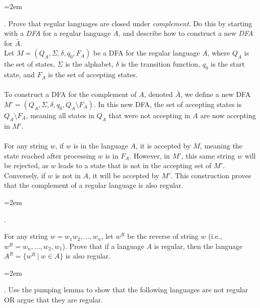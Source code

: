 \documentclass[12pt]{article}
\newcounter{quesnum}
\newcommand{\question}[2][??]{
\begin{list}{\labelitemi}{\leftmargin=2em}
\item [\arabic{quesnum}.] {} {#2}
\end{list}
\addtocounter{quesnum}{1}
}
\begin{document}

\vspace{12pt}

\question[3]{
Prove that regular languages are closed under \emph{complement}. Do this by starting with a \emph{DFA} for a regular language $A$, and describe how to construct a new \emph{DFA} for $\bar{A}$.
\\

Let $M = (Q_A, \Sigma, \delta, q_0, F_A)$ be a DFA for the regular language $A$, where $Q_A$ is the set of states, $\Sigma$ is the alphabet, $\delta$ is the transition function, $q_0$ is the start state, and $F_A$ is the set of accepting states.\\
\\
To construct a DFA for the complement of $A$, denoted $\bar{A}$, we define a new DFA $M' = (Q_A, \Sigma, \delta, q_0, Q_A \setminus F_A)$. In this new DFA, the set of accepting states is $Q_A \setminus F_A$, meaning all states in $Q_A$ that were not accepting in $A$ are now accepting in $M'$.\\
\\
For any string $w$, if $w$ is in the language $A$, it is accepted by $M$, meaning the state reached after processing $w$ is in $F_A$. However, in $M'$, this same string $w$ will be rejected, as $w$ leads to a state that is not in the accepting set of $M'$. Conversely, if $w$ is not in $A$, it will be accepted by $M'$. This construction proves that the complement of a regular language is also regular.
}

\vspace{12pt}

\question[3]{
For any string $w = w_1w_2,...,w_n$, let $w^R$ be the reverse of string $w$ (i.e., $w^R=w_n,...,w_2,w_1$). Prove that if a language $A$ is regular, then the language $A^R = \{w^R \ | \ w \in A\}$ is also regular.


}


\vspace{12pt}

\question[3]{
Use the pumping lemma to show that the following languages are not regular OR argue that they are regular. 
}
\end{document}
